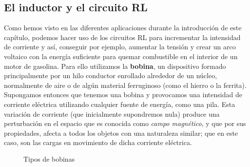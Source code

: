 \documentclass[../main.tex]{subfiles}
\begin{document}
\subsection{El inductor y el circuito RL}
Como hemos visto en las diferentes aplicaciones durante la introducción de este capítulo, podemos hacer uso de los circuitos RL para incrementar la intensidad de corriente y así, conseguir por ejemplo, aumentar la tensión y crear un arco voltaico con la energía suficiente para quemar combustible en el interior de un motor de gasolina. Para ello utilizamos la \textbf{bobina}, un dispositivo formado principalmente por un hilo conductor enrollado alrededor de un núcleo, normalmente de aire o de algún material ferruginoso (como el hierro o la ferrita).\\


Supongamos entonces que tenemos una bobina y provocamos una intensidad de corriente eléctrica utilizando cualquier fuente de energía, como una pila. Esta variación de corriente (que inicialmente supondremos nula) produce una perturbación en el espacio que es conocida como \textit{campo magnético}, y que por sus propiedades, afecta a todos los objetos con una naturaleza similar; que en este caso, son las cargas en movimiento de dicha corriente eléctrica.


\begin{figure}[!h]
    \centering
    \caption{Tipos de bobinas}
    \label{fig::tipos_bobinas}
\end{figure}
\end{document}
